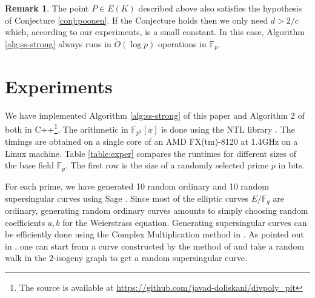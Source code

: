\documentclass[review]{elsarticle}
\theoremstyle{plain}
\theoremstyle{definition}
\newtheorem*{remark}{Remark}
\newcommand{\tildO}{\tilde{O}}
\def\F{\ensuremath{\mathbb{F}}}
\begin{document}
\begin{remark}
	The point $P \in E(K)$ described above also satisfies the hypothesis of Conjecture 
	\ref{conj:poonen}. If the Conjecture holds then we only need $d > 2 / c$ which, according to 
	our experiments, is a small constant. In this case, Algorithm \ref{alg:ss-strong} always runs 
	in $\tildO(\log p)$ operations in $\F_p$.
\end{remark}




\section{Experiments}

We have implemented Algorithm \ref{alg:ss-strong} of this paper and Algorithm 2 of 
\cite{sutherland2012} both in C++\footnote{The source is available at 
\url{https://github.com/javad-doliskani/divpoly_pit}}. The arithmetic in $\F_{p^2}[x]$ is done 
using the NTL library \cite{shoup2001ntl}. The timings are obtained on a single core of an AMD 
FX(tm)-8120 at 1.4GHz on a Linux machine. Table \ref{table:exper} compares the runtimes for 
different sizes of the base field $\F_p$. The first row is the size of a randomly selected prime 
$p$ in bits. 

For each prime, we have generated 10 random ordinary and 10 random supersingular curves using Sage 
\cite{stein2008sage}. Since most of the elliptic curves $E/\F_q$ are ordinary, generating random 
ordinary curves amounts to simply choosing random coefficients $a, b$ for the Weierstrass equation. 
Generating supersingular curves can be efficiently done using the Complex Multiplication 
method in \cite{broker2009}. As pointed out in \cite{sutherland2012}, one can start from a curve 
constructed by the method of \cite{broker2009} and take a random walk in the $2$-isogeny graph to 
get a random supersingular curve.
\end{document}
